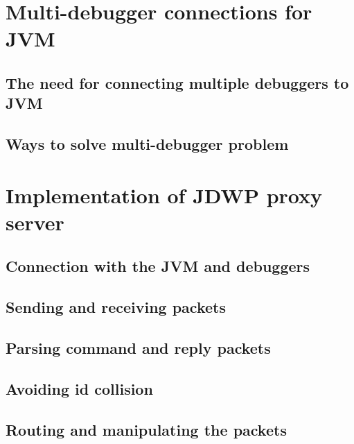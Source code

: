 \documentclass{style/bachelor-thesis}
\begin{document}
\pagebreak

\section{Multi-debugger connections for JVM}
\label{sec:proxy}


\subsection{The need for connecting multiple debuggers to JVM}
\label{sec:need_for_proxy}


\subsection{Ways to solve multi-debugger problem}
\label{sec:proxy_solutions}


\pagebreak

\section{Implementation of JDWP proxy server}
\label{sec:implemenation}


\subsection{Connection with the JVM and debuggers}
\label{sec:impl_connection}


\subsection{Sending and receiving packets}
\label{sec:impl_io}


\subsection{Parsing command and reply packets}
\label{sec:impl_parsing}


\subsection{Avoiding id collision}
\label{sec:impl_id}


\subsection{Routing and manipulating the packets}
\end{document}
